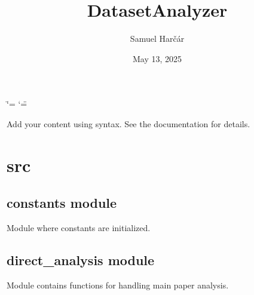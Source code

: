 \documentclass[letterpaper,10pt,english]{sphinxmanual}
\title{DatasetAnalyzer}
\date{May 13, 2025}
\author{Samuel Harčár}
\begin{document}
\ifdefined\shorthandoff
  \ifnum\catcode`\=\string=\active\shorthandoff{=}\fi
  \ifnum\catcode`\"=\active{}\fi
\fi

\pagestyle{empty}
\sphinxmaketitle
\pagestyle{plain}
\sphinxtableofcontents
\pagestyle{normal}
\label{\detokenize{index::doc}}


\sphinxAtStartPar
Add your content using  syntax. See the
documentation for details.

\sphinxstepscope


\chapter{src}
\label{\detokenize{modules:src}}\label{\detokenize{modules::doc}}
\sphinxstepscope


\section{constants module}
\label{\detokenize{constants:module-constants}}\label{\detokenize{constants:constants-module}}\label{\detokenize{constants::doc}}
\sphinxAtStartPar
Module where constants are initialized.

\sphinxstepscope


\section{direct\_analysis module}
\label{\detokenize{direct_analysis:module-direct_analysis}}\label{\detokenize{direct_analysis:direct-analysis-module}}\label{\detokenize{direct_analysis::doc}}
\sphinxAtStartPar
Module contains functions for handling main paper analysis.
\end{document}
